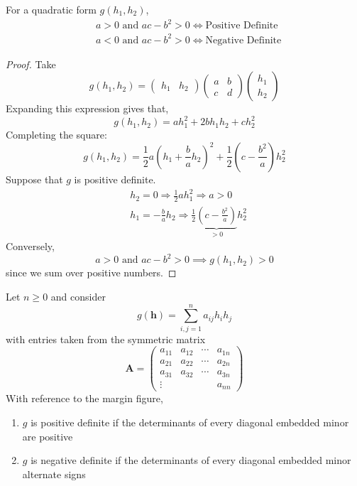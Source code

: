 \begin{prop}
     For a quadratic form $g(h_1, h_2)$,
    \begin{align*}
        &a > 0 \text{ and } ac-b^2 > 0 \iff \text{Positive Definite}\\
        &a < 0 \text{ and } ac-b^2 > 0 \iff \text{Negative Definite}
    \end{align*}
\end{prop}

\begin{proof}
    Take
    \[g(h_1, h_2) = \left( \begin{array}{cc}
         h_1 & h_2
    \end{array}\right) \left(\begin{array}{cc}
        a & b \\
        c & d
    \end{array}\right)\left( \begin{array}{c}
         h_1 \\ h_2
    \end{array}\right)\]
    Expanding this expression gives that,
    \[g(h_1, h_2) = ah_1^2 + 2bh_1h_2 + ch_2^2\]
    Completing the square:
    \[g\left(h_1, h_2\right)=\frac{1}{2} a\left(h_1+\frac{b}{a} h_2\right)^2+\frac{1}{2}\left(c-\frac{b^2}{a}\right) h_2^2\]
    Suppose that $g$ is positive definite.
    \begin{align*}
    &h_2=0 \Rightarrow \frac{1}{2} a h_1^2 \Rightarrow a>0 \\
    &h_1=-\frac{b}{a} h_2 \Rightarrow \frac{1}{2} \underbrace{\left(c-\frac{b^2}{a}\right)}_{>0} h_2^2
    \end{align*}
    Conversely,
    \[a > 0 \text{ and } ac-b^2 > 0 \implies g\left(h_1, h_2\right) > 0\]
    since we sum over positive numbers.
\end{proof}


\begin{rmk}
    Let $n \geq 0$ and consider
   \[g(\mathbf{h}) = \sum_{i,j=1}^n a_{ij} h_i h_j\]
   with entries taken from the symmetric matrix
   \[\mathbf{A} = \left(\begin{array}{cccc}
    a_{11} & a_{12} & \cdots & a_{1 n} \\
    a_{21} & a_{22} & \cdots & a_{2 n} \\
    a_{31} & a_{32} & \cdots & a_{3 n} \\
    \vdots & & & a_{n n}
    \end{array}\right)\]
    With reference to the margin figure,
    \begin{enumerate}
        \item $g$ is positive definite if the determinants of every diagonal embedded minor are positive
        \item $g$ is negative definite if the determinants of every diagonal embedded minor alternate signs
    \end{enumerate}
\end{rmk}

